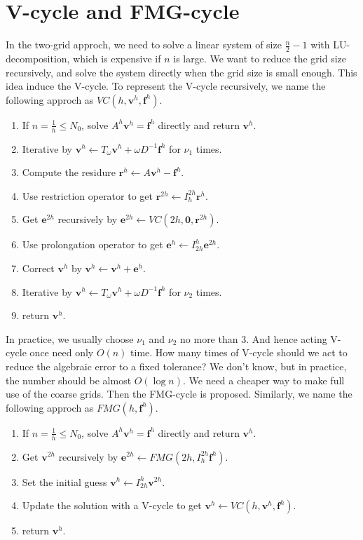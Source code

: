 \documentclass{SBCbookchapter}
\begin{document}
\section{V-cycle and FMG-cycle}

In the two-grid approch, we need to solve a linear system of size $\frac{n}{2}-1$ with LU-decomposition, which is expensive if $n$ is large. We want to reduce the grid size recursively, and solve the system directly when the grid size is small enough. This idea induce the V-cycle. To represent the V-cycle recursively, we name the following approch as $VC(h,\mathbf{v}^h,\mathbf{f}^h)$.

\begin{enumerate}[(VC-1)]
	\setlength{\itemsep}{-0.5ex}%
	\item If $n=\frac{1}{h}\leq N_0$, solve $A^h\mathbf{v}^h=\mathbf{f}^h$ directly and return $\mathbf{v}^h$.
	\item Iterative by $\mathbf{v}^h\gets T_\omega \mathbf{v}^h+\omega D^{-1} \mathbf{f}^h$ for $\nu_1$ times.
	\item Compute the residure $\mathbf{r}^h\gets A\mathbf{v}^h-\mathbf{f}^h$.
	\item Use restriction operator to get $\mathbf{r}^{2h}\gets I_h^{2h}\mathbf{r}^h$.
	\item Get $\mathbf{e}^{2h}$ recursively by $\mathbf{e}^{2h}\gets VC\left(2h,\mathbf{0},\mathbf{r}^{2h}\right)$.
	\item Use prolongation operator to get $\mathbf{e}^h\gets I_{2h}^h \mathbf{e}^{2h}$.
	\item Correct $\mathbf{v}^h$ by $\mathbf{v}^h\gets \mathbf{v}^h+\mathbf{e}^h$.
	\item Iterative by $\mathbf{v}^h\gets T_\omega \mathbf{v}^h+\omega D^{-1} \mathbf{f}^h$ for $\nu_2$ times.
	\item return $\mathbf{v}^h$.
\end{enumerate}

In practice, we usually choose $\nu_1$ and $\nu_2$ no more than $3$. And hence acting V-cycle once need only $O(n)$ time. How many times of V-cycle should we act to reduce the algebraic error to a fixed tolerance? We don't know, but in practice, the number should be almost $O(\log n)$. We need a cheaper way to make full use of the coarse grids. Then the FMG-cycle is proposed. Similarly, we name the following approch as $FMG(h,\mathbf{f}^h)$.

\begin{enumerate}[(FMG-1)]
	\setlength{\itemsep}{-0.5ex}%
	\item If $n=\frac{1}{h}\leq N_0$, solve $A^h\mathbf{v}^h=\mathbf{f}^h$ directly and return $\mathbf{v}^h$.
	\item Get $\mathbf{v}^{2h}$ recursively by $\mathbf{e}^{2h}\gets FMG\left(2h,I_{h}^{2h}\mathbf{f}^{h}\right)$.
	\item Set the initial guess $\mathbf{v}^h\gets I_{2h}^h \mathbf{v}^{2h}$.
	\item Update the solution with a V-cycle to get $\mathbf{v}^h\gets VC(h,\mathbf{v}^h,\mathbf{f}^h)$.
	\item return $\mathbf{v}^h$.
\end{enumerate}
\end{document}
